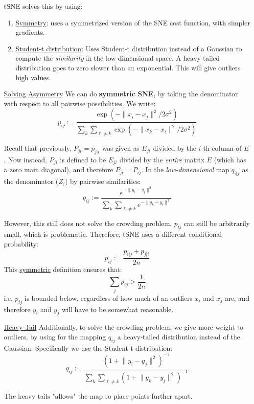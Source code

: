 \documentclass{article}
\begin{document}
tSNE solves this by using:
\begin{enumerate}

  \item \ul{Symmetry}: uses a symmetrized version of the SNE cost function, with simpler gradients.
  \item \ul{Student-t distribution}: Uses Student-t distribution instead of a Gaussian to compute the \textit{similarity} in the low-dimensional space. A heavy-tailed distribution goes to zero slower than an exponential. This will give outliers high values.  

\end{enumerate}


\ul{Solving Asymmetry} We can do \textbf{symmetric SNE}, by taking the denominator with respect to all pairwise possibilities. We write:
\[
  p_{ij} := \frac{\exp(- \lVert x_i -x_j \rVert^2 / 2 \sigma ^2) } {\sum_{k} \sum_{\ell \neq k } \exp(- \lVert x_k - x_{\ell} \rVert ^2 / 2 \sigma ^2 ) }
\]

Recall that previously, $P_{ji}=p_{j|i}$ was given as $E_{ji}$ divided by the $i$-th column of $E$. Now instead, $P_{ji}$ is defined to be $E_{ji}$ divided by the \textit{entire} matrix $E$ (which has a zero main diagonal), and therefore $P_{ji}=P_{ij}$. 
In the \textit{low-dimensional} map $q_{i|j}$ as  the denominator ($Z_i$) by pairwise similarities:
\[
  q_{ij} := \frac{e^{- \lVert y_i -y_j \rVert^2 } } {\sum_{k} \sum_{\ell \neq k } e^{- \lVert y_k - y_{\ell} \rVert ^2}   } 
\]

However, this still does not solve the crowding problem. $p_{ij}$ can still be arbitrarily small, which is problematic. Therefore, tSNE uses a different conditional probability:
  \[
    p_{ij} := \frac{p_{i|j} + p_{j|i}}{2n}
  \]
This \ul{symmetric} definition ensures that:
\[
  \sum_{j} p_{ij} > \frac{1}{2n}
\]
i.e. $p_{ij}$ is bounded below, regardless of how much of an outliers $x_i$ and $x_j$ are, and therefore $y_i$ and $y_j$ will have to be somewhat reasonable.  


\ul{Heavy-Tail} Additionally, to solve the crowding problem, we give more weight to outliers, by using for the mapping $q_{ij}$ a heavy-tailed distribution instead of the Gaussian. Specifically we use the Student-t distribution:
\[
  q_{ij} := \frac{(1 + \lVert y_i-y_j \rVert ^2)^{-1} }{ \sum_{k} \sum_{\ell \neq  k } (1 + \lVert y_k - y_j \rVert ^2 ) ^{-1}}
\]

The heavy tails "allows" the map to place points further apart. 
\end{document}
